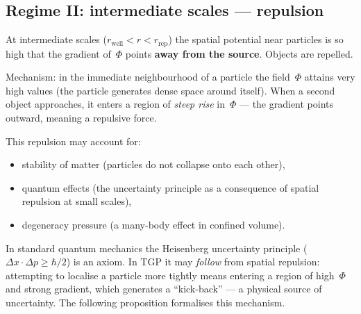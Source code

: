 \subsection{Regime II: intermediate scales --- repulsion}%
\label{ssec:odpychanie}

\begin{proposition}\label{prop:rep}
At intermediate scales
($r_{\mathrm{well}} < r < r_{\mathrm{rep}}$) the spatial potential
near particles is so high that the gradient of~$\Phi$ points
\textbf{away from the source}.  Objects are repelled.
\end{proposition}

Mechanism: in the immediate neighbourhood of a particle the
field~$\Phi$ attains very high values (the particle generates dense
space around itself).  When a second object approaches, it enters a
region of \emph{steep rise} in~$\Phi$ --- the gradient points
outward, meaning a repulsive force.

This repulsion may account for:
\begin{itemize}[nosep]
  \item stability of matter (particles do not collapse onto each
        other),
  \item quantum effects (the uncertainty principle as a consequence
        of spatial repulsion at small scales),
  \item degeneracy pressure (a many-body effect in confined volume).
\end{itemize}

\begin{remark}
In standard quantum mechanics the Heisenberg uncertainty principle
($\Delta x \cdot \Delta p \geq \hbar/2$) is an axiom.  In TGP it
may \emph{follow} from spatial repulsion: attempting to localise a
particle more tightly means entering a region of high~$\Phi$ and
strong gradient, which generates a ``kick-back'' --- a physical
source of uncertainty.  The following proposition formalises this
mechanism.
\end{remark}

